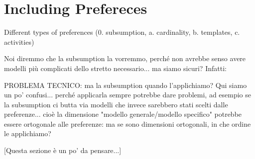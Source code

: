 
\section{Including Prefereces }
\label{sec:preferences}

Different types of preferences
(0. subsumption, a. cardinality, b. templates, c. activities)

Noi diremmo che la subsumption la vorremmo, perché non avrebbe senso avere modelli più complicati dello stretto necessario... ma siamo sicuri? Infatti:

PROBLEMA TECNICO: ma la subsumption quando l'applichiamo? Qui siamo un po' confusi... perché applicarla sempre potrebbe dare problemi, ad esempio se la subsumption ci butta via modelli che invece sarebbero stati scelti dalle preferenze... cioè la dimensione "modello generale/modello specifico" potrebbe essere ortogonale alle preferenze: ma se sono dimensioni ortogonali, in che ordine le applichiamo?

[Questa sezione è un po' da pensare...]
